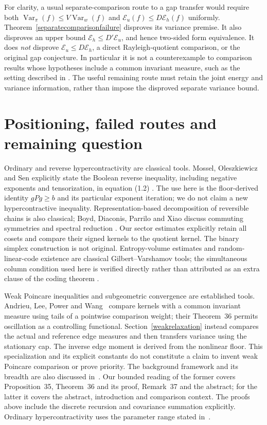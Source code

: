 \documentclass[11pt]{article}
\begin{document}
For clarity, a usual separate-comparison route to a gap transfer would
require both $\operatorname{Var}_\pi(f)\leq V\operatorname{Var}_w(f)$
and $\mathcal E_u(f)\leq D\mathcal E_h(f)$ uniformly.
Theorem~\ref{separatecomparisonfailure} disproves its variance premise.
It also disproves an upper bound $\mathcal E_h\leq D'\mathcal E_u$,
and hence two-sided form equivalence. It does \emph{not} disprove
$\mathcal E_u\leq D\mathcal E_h$, a direct Rayleigh-quotient
comparison, or the original gap conjecture. In particular it is not
a counterexample to comparison results whose hypotheses include a common
invariant measure, such as the setting described in \cite{alpw2022}.
The useful remaining route must retain the joint energy and variance
information, rather than impose the disproved separate variance bound.


\section{Positioning, failed routes and remaining question}
Ordinary and reverse hypercontractivity are classical tools. Mossel, Oleszkiewicz and Sen explicitly state the Boolean reverse inequality, including negative exponents and tensorization, in equation (1.2) \cite{mos}. The use here is the floor-derived identity $gPg\geq b$ and its particular exponent iteration; we do not claim a new hypercontractive inequality. Representation-based decomposition of reversible chains is also classical; Boyd, Diaconis, Parrilo and Xiao discuss commuting symmetries and spectral reduction \cite{boyd}. Our sector estimates explicitly retain all cosets and compare their signed kernels to the quotient kernel. The binary simplex construction is not original. Entropy-volume estimates and random-linear-code existence are classical Gilbert--Varshamov tools; the simultaneous column condition used here is verified directly rather than attributed as an extra clause of the coding theorem \cite{guruswami}.

Weak Poincare inequalities and subgeometric convergence are established tools.
Andrieu, Lee, Power and Wang~\cite{alpw2022} compare kernels with a common
invariant measure using tails of a pointwise comparison weight; their
Theorem~36 permits oscillation as a controlling functional. Section~\ref{weakrelaxation}
instead compares the actual and reference edge measures and then transfers
variance using the stationary cap. The inverse edge moment is derived from
the nonlinear floor. This specialization and its explicit constants do not
constitute a claim to invent weak Poincare comparison or prove priority.
The background framework and its breadth are also discussed in~\cite{alpw2023}.
Our bounded reading of the former covers Proposition~35, Theorem~36 and its
proof, Remark~37 and the abstract; for the latter it covers the abstract,
introduction and comparison context. The proofs above include the discrete
recursion and covariance summation explicitly. Ordinary hypercontractivity
uses the parameter range stated in~\cite{odonnelllecture}.
\end{document}
